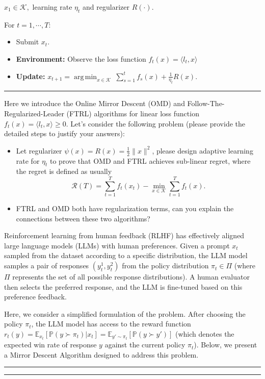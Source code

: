 \documentclass[11pt,oneside,a4paper]{article}
\DeclareMathOperator*{\argmin}{arg\,min}
\begin{document}
 $x_1\in \mathcal K,$ learning rate $\eta_t$ and regularizer $R(\cdot).$

\noindent For $t=1,\cdots, T:$ 
\begin{itemize}
\item {}  Submit $x_t.$
\item {\bf Environment:} Observe the loss function $f_t(x) = \langle l_t,x \rangle$
\item {\bf Update:} $x_{t+1} = \argmin_{x\in \mathcal K} ~ \sum_{s=1}^t f_s(x) + \frac{1}{\eta_t} R(x).$

\end{itemize}
\vspace{0.02in}
\hrule
\vspace{0.1in}
Here we introduce the Online Mirror Descent (OMD) and Follow-The-Regularized-Leader (FTRL) algorithms for linear loss function $f_t(x) = \langle l_t, x\rangle \geq 0$. Let's consider the following problem (please provide the detailed steps to justify your answers):
\begin{itemize}
    \item Let regularizer $\psi(x) = R(x) = \frac{1}{2} \|x\|^2$, please design adaptive learning rate for $\eta_t$ to prove that OMD and FTRL achieves sub-linear regret, where the regret is defined as usually $$\mathcal R(T)=\sum_{t=1}^T f_t(x_t) - \min_{x\in \mathcal K} \sum_{t=1}^T f_t(x).$$
    \item FTRL and OMD both have regularization terms, can you explain the connections between these two algorithms?
\end{itemize}



\newpage

\vspace{0.5cm}

\noindent 
Reinforcement learning from human feedback (RLHF) has effectively aligned large language models (LLMs) with human preferences. Given a prompt $x_t$ sampled from the dataset according to a specific distribution, the LLM model samples a pair of responses $(y^1_t,y^2_t)$ from the policy distribution $\pi_t \in \Pi$ (where $\Pi$ represents the set of all possible response distributions). A human evaluator then selects the preferred response, and the LLM is fine-tuned based on this preference feedback.

Here, we consider a simplified formulation of the problem. After choosing the policy $\pi_t$, the LLM model has access to the reward function $r_t(y) = \mathbb{E}_{x_t}[ \mathbb{P}(y \succ \pi_t)|x_t] = \mathbb{E}_{y'\sim\pi_t}[\mathbb{P}(y \succ y') ]$ (which denotes the expected win rate of response $y$ against the current policy $\pi_t$). Below, we present a Mirror Descent Algorithm designed to address this problem.
\vspace{0.1in}
\hrule
\vspace{0.05in}
\vspace{0.05in}
\hrule
\vspace{0.05in}
\end{document}
